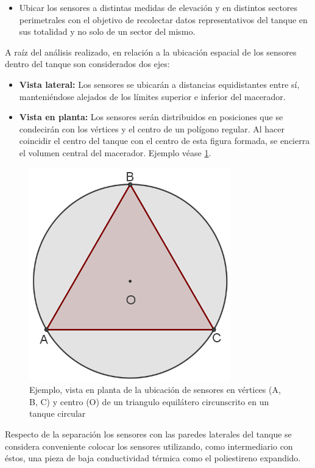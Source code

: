 \begin{itemize}
\begin{itemize}
            \item Ubicar los sensores a distintas medidas de elevación y en distintos sectores perimetrales con el objetivo de recolectar datos representativos del tanque en sus totalidad y no solo de un sector del mismo.
            
        \end{itemize}
       
        \par
        A raíz del análisis realizado, en relación a la ubicación espacial de los sensores dentro del tanque son considerados dos ejes:
        \begin{itemize}
            
            \item \textbf{Vista lateral: }Los sensores se ubicarán a distancias equidistantes entre sí, manteniéndose alejados de los límites superior e inferior del macerador.
            
            \item \textbf{Vista en planta: }Los sensores serán distribuidos en posiciones que se condecirán con los vértices y el centro de un polígono regular. Al hacer coincidir el centro del tanque con el centro de esta figura formada, se encierra el volumen central del macerador. Ejemplo véase \ref{fig:PosSens}.
            
        \end{itemize}
        
        \begin{figure}[H]            
        \centering
            \includegraphics[scale = 0.4]{hardware/posicionesSensores.jpg}
            \caption{Ejemplo, vista en planta de la ubicación de sensores en vértices (A, B, C) y centro (O) de un triangulo equilátero circunscrito en un tanque circular }
            \label{fig:PosSens}
        \end{figure}
        
        \par
        Respecto de la separación los sensores con las paredes laterales del tanque se considera conveniente colocar los sensores utilizando, como intermediario con éstos, una pieza de baja conductividad térmica como el poliestireno expandido.
        
    \end{itemize}

